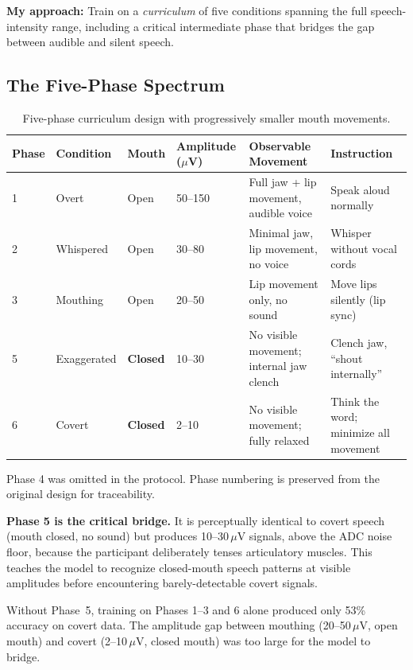 \documentclass{article}
\begin{document}
\textbf{My approach:} Train on a \emph{curriculum} of five conditions spanning the full speech-intensity range, including a critical intermediate phase that bridges the gap between audible and silent speech.

\subsection{The Five-Phase Spectrum}

\begin{table}[h]
\centering
\caption{Five-phase curriculum design with progressively smaller mouth movements.}
\label{tab:curriculum}
\begin{tabular}{@{}llllll@{}}
\toprule
Phase & Condition & Mouth & Amplitude ($\mu$V) & Observable Movement & Instruction \\
\midrule
1 & Overt         & Open     & 50--150 & Full jaw + lip movement, audible voice & Speak aloud normally \\
2 & Whispered     & Open     & 30--80  & Minimal jaw, lip movement, no voice & Whisper without vocal cords \\
3 & Mouthing      & Open     & 20--50  & Lip movement only, no sound & Move lips silently (lip sync) \\
5 & Exaggerated   & \textbf{Closed} & 10--30  & No visible movement; internal jaw clench & Clench jaw, ``shout internally'' \\
6 & Covert        & \textbf{Closed} & 2--10   & No visible movement; fully relaxed & Think the word; minimize all movement \\
\bottomrule
\end{tabular}
\end{table}

Phase 4 was omitted in the protocol. Phase numbering is preserved from the original design for traceability.

\textbf{Phase 5 is the critical bridge.} It is perceptually identical to covert speech (mouth closed, no sound) but produces 10--30\,$\mu$V signals, above the ADC noise floor, because the participant deliberately tenses articulatory muscles. This teaches the model to recognize closed-mouth speech patterns at visible amplitudes before encountering barely-detectable covert signals.

Without Phase~5, training on Phases 1--3 and 6 alone produced only 53\% accuracy on covert data. The amplitude gap between mouthing (20--50\,$\mu$V, open mouth) and covert (2--10\,$\mu$V, closed mouth) was too large for the model to bridge.
\end{document}
